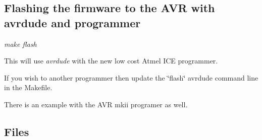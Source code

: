 \subsection*{Flashing the firmware to the A\+VR with avrdude and programmer}


\begin{DoxyItemize}
\item {\itshape make flash}
\begin{DoxyItemize}
\item This will use {\itshape avrdude} with the new low cost Atmel I\+CE programmer.
\begin{DoxyItemize}
\item If you wish to another programmer then update the \char`\"{}flash\char`\"{} avrdude command line in the Makefile.
\item There is an example with the A\+VR mkii programer as well.
\end{DoxyItemize}
\end{DoxyItemize}
\end{DoxyItemize}

\subsection*{Files}


